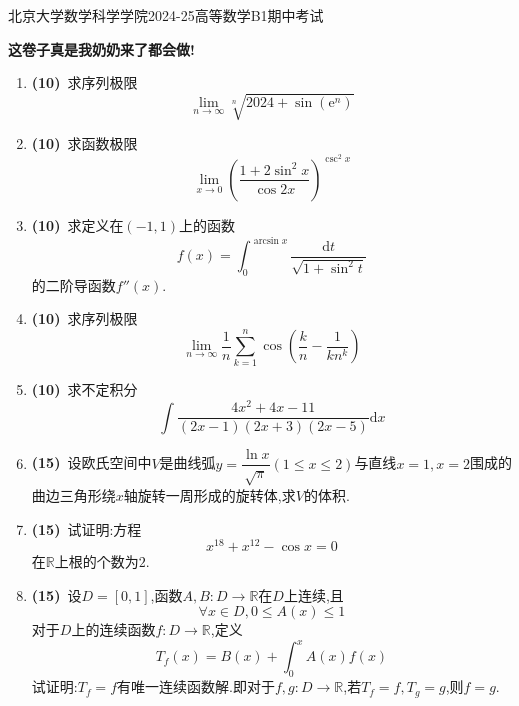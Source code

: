 \documentclass{ctexart}
\newcommand{\e}{\mathrm{e}}
\newcommand{\di}{\mathrm{d}}
\newcommand{\R}{\mathbb{R}}
\newcommand{\dx}{\di x}
\begin{document}
\pagestyle{empty}
\begin{center}\Large
    北京大学数学科学学院2024-25高等数学B1期中考试
\end{center}
\textbf{\songti 这卷子真是我奶奶来了都会做!}
\begin{enumerate}[leftmargin=*,label=\textbf{\arabic*.}]
    \item \textbf{(10)}\ 求序列极限$$\lim_{n\to\infty}{\sqrt[n]{2024+\sin\left(\e^n\right)}}$$
    \item \textbf{(10)}\ 求函数极限$$\lim_{x\to0}\left(\dfrac{1+2\sin^2x}{\cos2x}\right)^{\csc^2x}$$
    \item \textbf{(10)}\ 求定义在$(-1,1)$上的函数$$f(x)=\int_0^{\arcsin x}\dfrac{\di t}{\sqrt{1+\sin^2t}}$$的二阶导函数$f''(x)$.
    \item \textbf{(10)}\ 求序列极限$$\lim_{n\to\infty}\dfrac{1}{n}\sum_{k=1}^{n}\cos\left(\dfrac{k}{n}-\dfrac{1}{kn^k}\right)$$
    \item \textbf{(10)}\ 求不定积分$$\int{\dfrac{4x^2+4x-11}{(2x-1)(2x+3)(2x-5)}\dx}$$
    \item \textbf{(15)}\ 设欧氏空间中$V$是曲线弧$\displaystyle y=\dfrac{\ln{x}}{\sqrt{\pi}}(1\leqslant x\leqslant 2)$与直线$x=1,x=2$围成的曲边三角形绕$x$轴旋转一周形成的旋转体,求$V$的体积.
    \item \textbf{(15)}\ 试证明:方程$$x^{18}+x^{12}-\cos x=0$$在$\R$上根的个数为$2$.
    \item \textbf{(15)}\ 设$D=[0,1]$,函数$A,B:D\to\R$在$D$上连续,且$$\forall x\in D,0\leqslant A(x)\leqslant 1$$
        对于$D$上的连续函数$f:D\to\R$,定义$$T_f(x)=B(x)+\int_0^xA(x)f(x)$$试证明:$T_f=f$有唯一连续函数解.即对于$f,g:D\to\R$,若$T_f=f,T_g=g$,则$f=g$.
\end{enumerate}
\end{document}
